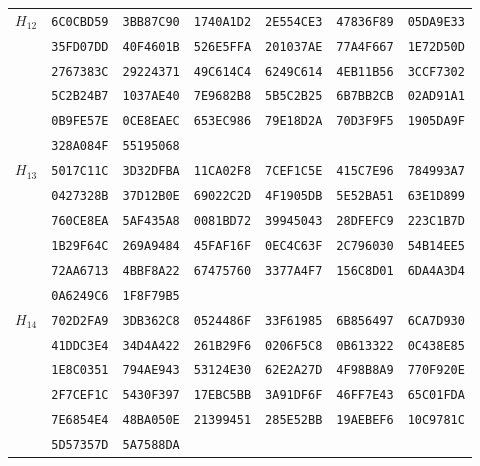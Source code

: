 \begin{table}
\begin{tabular}{@{}ccccccc@{}}
\midrule
\multirow{6}{*}{$H_{12}$}
 & \texttt{6C0CBD59} & \texttt{3BB87C90} & \texttt{1740A1D2} & \texttt{2E554CE3} & \texttt{47836F89} & \texttt{05DA9E33}\\
 & \texttt{35FD07DD} & \texttt{40F4601B} & \texttt{526E5FFA} & \texttt{201037AE} & \texttt{77A4F667} & \texttt{1E72D50D}\\
 & \texttt{2767383C} & \texttt{29224371} & \texttt{49C614C4} & \texttt{6249C614} & \texttt{4EB11B56} & \texttt{3CCF7302}\\
 & \texttt{5C2B24B7} & \texttt{1037AE40} & \texttt{7E9682B8} & \texttt{5B5C2B25} & \texttt{6B7BB2CB} & \texttt{02AD91A1}\\
 & \texttt{0B9FE57E} & \texttt{0CE8EAEC} & \texttt{653EC986} & \texttt{79E18D2A} & \texttt{70D3F9F5} & \texttt{1905DA9F}\\
 & \texttt{328A084F} & \texttt{55195068}\\

\midrule
\multirow{6}{*}{$H_{13}$}
 & \texttt{5017C11C} & \texttt{3D32DFBA} & \texttt{11CA02F8} & \texttt{7CEF1C5E} & \texttt{415C7E96} & \texttt{784993A7}\\
 & \texttt{0427328B} & \texttt{37D12B0E} & \texttt{69022C2D} & \texttt{4F1905DB} & \texttt{5E52BA51} & \texttt{63E1D899}\\
 & \texttt{760CE8EA} & \texttt{5AF435A8} & \texttt{0081BD72} & \texttt{39945043} & \texttt{28DFEFC9} & \texttt{223C1B7D}\\
 & \texttt{1B29F64C} & \texttt{269A9484} & \texttt{45FAF16F} & \texttt{0EC4C63F} & \texttt{2C796030} & \texttt{54B14EE5}\\
 & \texttt{72AA6713} & \texttt{4BBF8A22} & \texttt{67475760} & \texttt{3377A4F7} & \texttt{156C8D01} & \texttt{6DA4A3D4}\\
 & \texttt{0A6249C6} & \texttt{1F8F79B5}\\

\midrule
\multirow{6}{*}{$H_{14}$}
 & \texttt{702D2FA9} & \texttt{3DB362C8} & \texttt{0524486F} & \texttt{33F61985} & \texttt{6B856497} & \texttt{6CA7D930}\\
 & \texttt{41DDC3E4} & \texttt{34D4A422} & \texttt{261B29F6} & \texttt{0206F5C8} & \texttt{0B613322} & \texttt{0C438E85}\\
 & \texttt{1E8C0351} & \texttt{794AE943} & \texttt{53124E30} & \texttt{62E2A27D} & \texttt{4F98B8A9} & \texttt{770F920E}\\
 & \texttt{2F7CEF1C} & \texttt{5430F397} & \texttt{17EBC5BB} & \texttt{3A91DF6F} & \texttt{46FF7E43} & \texttt{65C01FDA}\\
 & \texttt{7E6854E4} & \texttt{48BA050E} & \texttt{21399451} & \texttt{285E52BB} & \texttt{19AEBEF6} & \texttt{10C9781C}\\
 & \texttt{5D57357D} & \texttt{5A7588DA}\\


\end{tabular}
\end{table}
